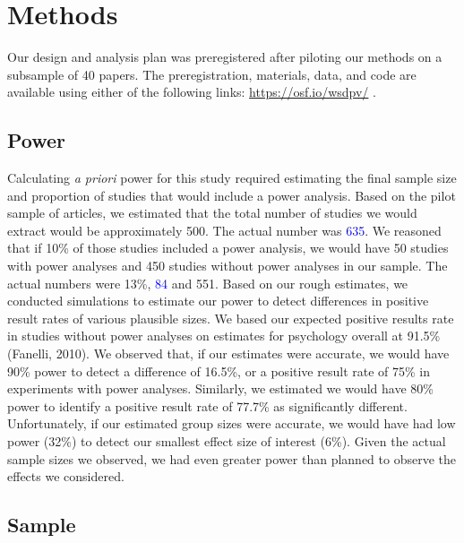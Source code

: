 \documentclass[
  man, donotrepeattitle,mask,floatsintext]{apa7}
\begin{document}
\hypertarget{methods}{%
\section{Methods}\label{methods}}

Our design and analysis plan was preregistered after piloting our methods on a subsample of 40 papers. The preregistration, materials, data, and code are available using either of the following links: \url{https://osf.io/wsdpv/}  .

\hypertarget{power}{%
\subsection{Power}\label{power}}

Calculating \emph{a priori} power for this study required estimating the final sample size and proportion of studies that would include a power analysis. Based on the pilot sample of articles, we estimated that the total number of studies we would extract would be approximately 500. The actual number was \textcolor{blue}{635}. We reasoned that if 10\% of those studies included a power analysis, we would have 50 studies with power analyses and 450 studies without power analyses in our sample. The actual numbers were 13\%, \textcolor{blue}{84} and 551. Based on our rough estimates, we conducted simulations to estimate our power to detect differences in positive result rates of various plausible sizes. We based our expected positive results rate in studies without power analyses on estimates for psychology overall at 91.5\% (Fanelli, 2010). We observed that, if our estimates were accurate, we would have 90\% power to detect a difference of 16.5\%, or a positive result rate of 75\% in experiments with power analyses. Similarly, we estimated we would have 80\% power to identify a positive result rate of 77.7\% as significantly different. Unfortunately, if our estimated group sizes were accurate, we would have had low power (32\%) to detect our smallest effect size of interest (6\%). Given the actual sample sizes we observed, we had even greater power than planned to observe the effects we considered.

\hypertarget{sample}{%
\subsection{Sample}\label{sample}}
\end{document}
